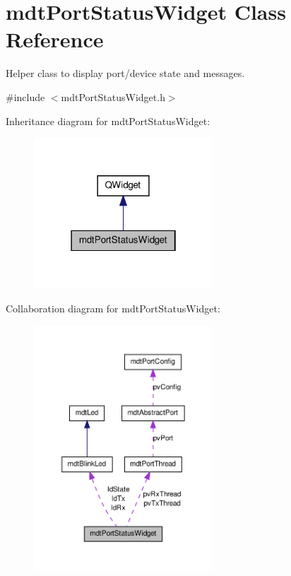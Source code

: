 \hypertarget{classmdt_port_status_widget}{\section{mdt\-Port\-Status\-Widget Class Reference}
\label{classmdt_port_status_widget}
}


Helper class to display port/device state and messages.  




{\ttfamily \#include $<$mdt\-Port\-Status\-Widget.\-h$>$}



Inheritance diagram for mdt\-Port\-Status\-Widget\-:\nopagebreak
\begin{figure}[H]
\begin{center}
\leavevmode
\includegraphics[width=190pt]{classmdt_port_status_widget__inherit__graph}
\end{center}
\end{figure}


Collaboration diagram for mdt\-Port\-Status\-Widget\-:\nopagebreak
\begin{figure}[H]
\begin{center}
\leavevmode
\includegraphics[width=190pt]{classmdt_port_status_widget__coll__graph}
\end{center}
\end{figure}
